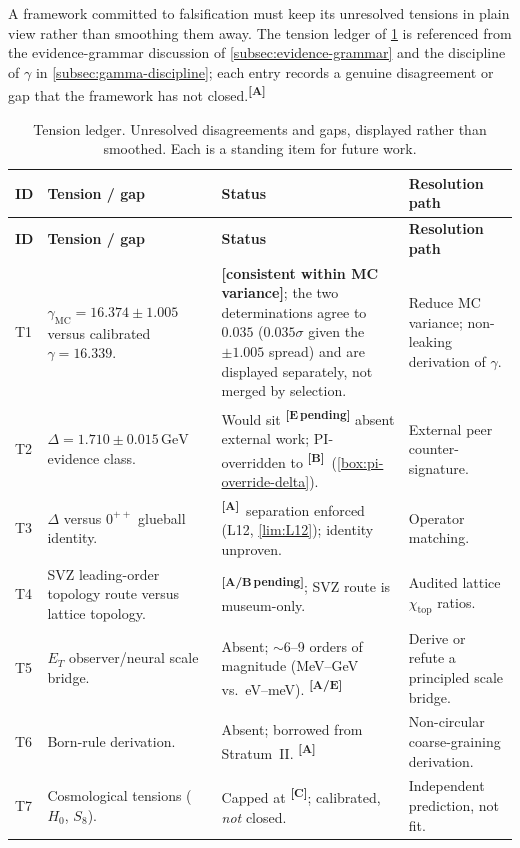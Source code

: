 \documentclass[12pt,a4paper,twoside]{article}
\theoremstyle{plain}
\theoremstyle{definition}
\theoremstyle{remark}
\newcommand{\GeV}{\,\mathrm{GeV}}
\newcommand{\catmark}[1]{\textsuperscript{\textsf{\textbf{[#1]}}}}
\newcommand{\DeltaGap}{1.710 \pm 0.015\GeV} %
\newcommand{\GammaGeom}{16.339} %
\newcommand{\GammaMC}{16.374 \pm 1.005} %
\begin{document}
A framework committed to falsification must keep its unresolved tensions in plain view rather than smoothing them away. The tension ledger of \cref{tab:tensions} is referenced from the evidence-grammar discussion of \cref{subsec:evidence-grammar} and the discipline of $\gamma$ in \cref{subsec:gamma-discipline}; each entry records a genuine disagreement or gap that the framework has not closed.\catmark{A}

{\small
\renewcommand{\arraystretch}{1.3}
\begin{longtable}{p{} p{} p{} p{}}
\caption{Tension ledger. Unresolved disagreements and gaps, displayed rather than
smoothed. Each is a standing item for future work.}
\label{tab:tensions}\\
\toprule
\textbf{ID} & \textbf{Tension / gap} & \textbf{Status} & \textbf{Resolution path} \\
\midrule
\endfirsthead
\toprule
\textbf{ID} & \textbf{Tension / gap} & \textbf{Status} & \textbf{Resolution path} \\
\midrule
\endhead
\bottomrule
\endfoot
T1 & $\gamma_{\mathrm{MC}} = \GammaMC$ versus calibrated $\gamma = \GammaGeom$. & \textbf{[consistent within MC variance]}; the two determinations agree to $0.035$ ($0.035\sigma$ given the $\pm1.005$ spread) and are displayed separately, not merged by selection. & Reduce MC variance; non-leaking derivation of $\gamma$. \\
T2 & $\Delta = \DeltaGap$ evidence class. & Would sit \catmark{E\,pending} absent external work; PI-overridden to \catmark{B}\ (\cref{box:pi-override-delta}). & External peer counter-signature. \\
T3 & $\Delta$ versus $0^{++}$ glueball identity. & \catmark{A}\ separation enforced (L12, \cref{lim:L12}); identity unproven. & Operator matching. \\
T4 & SVZ leading-order topology route versus lattice topology. & \catmark{A/B\,pending}; SVZ route is museum-only. & Audited lattice $\chi_{\mathrm{top}}$ ratios. \\
T5 & $E_T$ observer/neural scale bridge. & Absent; $\sim$6--9 orders of magnitude (MeV--GeV vs.\ eV--meV). \catmark{A/E} & Derive or refute a principled scale bridge. \\
T6 & Born-rule derivation. & Absent; borrowed from Stratum~II. \catmark{A} & Non-circular coarse-graining derivation. \\
T7 & Cosmological tensions ($H_0$, $S_8$). & Capped at \catmark{C}; calibrated, \emph{not} closed. & Independent prediction, not fit. \\
\bottomrule
\end{longtable}
}
\end{document}
